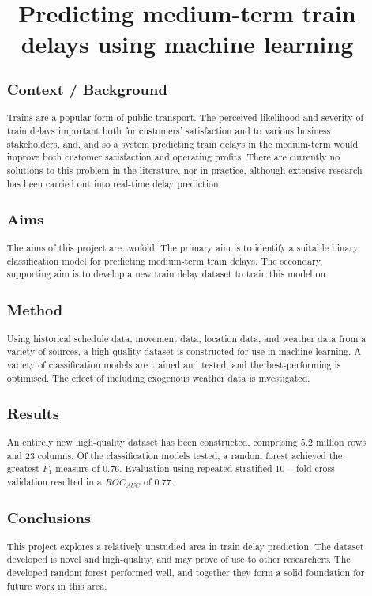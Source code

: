 \documentclass[12pt,a4paper]{article}
\title{Predicting medium-term train delays using machine learning}
\date{}
\begin{document}
\maketitle

\begin{abstract}

\subsection{Context / Background}

Trains are a popular form of public transport. The perceived likelihood and severity of train delays important both for customers' satisfaction and to various business stakeholders, and, and so a system predicting train delays in the medium-term would improve both customer satisfaction and operating profits. There are currently no solutions to this problem in the literature, nor in practice, although extensive research has been carried out into real-time delay prediction.

\subsection{Aims}

The aims of this project are twofold. The primary aim is to identify a suitable binary classification model for predicting medium-term train delays. The secondary, supporting aim is to develop a new train delay dataset to train this model on.

\subsection{Method}

Using historical schedule data, movement data, location data, and weather data from a variety of sources, a high-quality dataset is constructed for use in machine learning. A variety of classification models are trained and tested, and the best-performing is optimised. The effect of including exogenous weather data is investigated.

\subsection{Results}

An entirely new high-quality dataset has been constructed, comprising $5.2$ million rows and $23$ columns. Of the classification models tested, a random forest achieved the greatest $F_1$-measure of $0.76$. Evaluation using repeated stratified $10-$fold cross validation resulted in a $ROC_{AUC}$ of $0.77$. 

\subsection{Conclusions}

This project explores a relatively unstudied area in train delay prediction. The dataset developed is novel and high-quality, and may prove of use to other researchers. The developed random forest performed well, and together they form a solid foundation for future work in this area.

\end{abstract}
\end{document}
